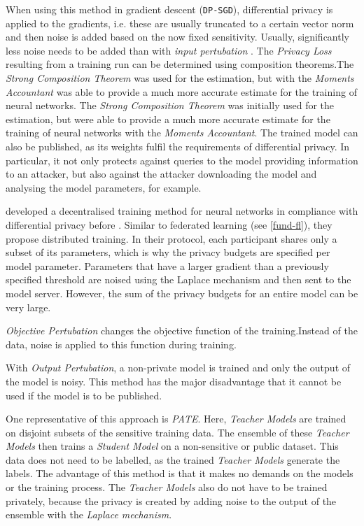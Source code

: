 When using this method in gradient descent (\texttt{DP-SGD}), differential privacy is applied to the gradients, i.e. these are usually truncated to a certain vector norm and then noise is added based on the now fixed sensitivity. Usually, significantly less noise needs to be added than with \textit{input pertubation} \cite{chang:2023}. The \textit{Privacy Loss} resulting from a training run can be determined using composition theorems.The \textit{Strong Composition Theorem}\cite{dwork:2010} was used for the estimation, but \textcite{abadi:2016} with the \textit{Moments Accountant} was able to provide a much more accurate estimate for the training of neural networks. 
The \textit{Strong Composition Theorem}\cite{dwork:2010} was initially used for the estimation, but \textcite{abadi:2016} were able to provide a much more accurate estimate for the training of neural networks with the \textit{Moments Accountant}. The trained model can also be published, as its weights fulfil the requirements of differential privacy. In particular, it not only protects against queries to the model providing information to an attacker, but also against the attacker downloading the model and analysing the model parameters, for example.

\textcite{shokri:2015} developed a decentralised training method for neural networks in compliance with differential privacy before \textcite{abadi:2016}. Similar to federated learning (see \autoref{fund-fl}), they propose distributed training. In their protocol, each participant shares only a subset of its parameters, which is why the privacy budgets are specified per model parameter. Parameters that have a larger gradient than a previously specified threshold are noised using the Laplace mechanism and then sent to the model server. 
However, the sum of the privacy budgets for an entire model can be very large\cite[p.10]{abadi:2016}.

\textit{Objective Pertubation} changes the objective function of the training.Instead of the data, noise is applied to this function during training.

With \textit{Output Pertubation}, a non-private model is trained and only the output of the model is noisy. This method has the major disadvantage that it cannot be used if the model is to be published.

One representative of this approach is \textit{PATE}\cite{papernot:2017}. Here, \textit{Teacher Models} are trained on disjoint subsets of the sensitive training data. The ensemble of these \textit{Teacher Models} then trains a \textit{Student Model} on a non-sensitive or public dataset. This data does not need to be labelled, as the trained \textit{Teacher Models} generate the labels. The advantage of this method is that it makes no demands on the models or the training process. The \textit{Teacher Models} also do not have to be trained privately, because the privacy is created by adding noise to the output of the ensemble with the \textit{Laplace mechanism}.

